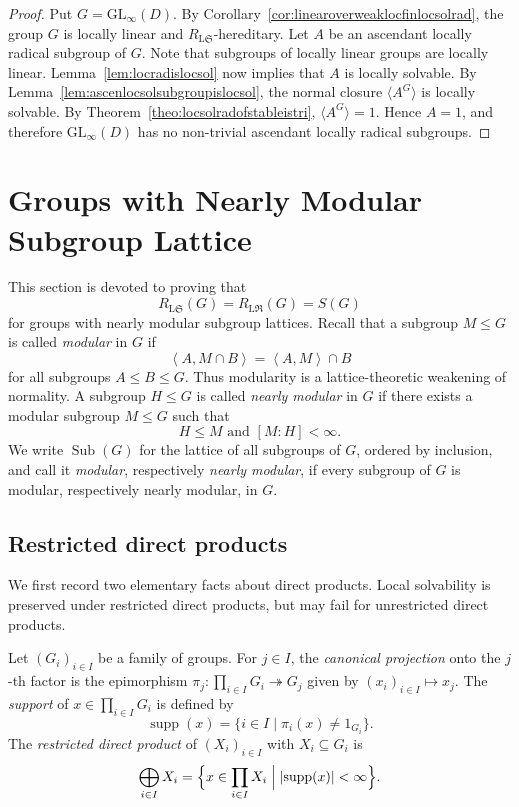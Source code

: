 \documentclass[11pt, reqno]{amsart}
\numberwithin{equation}{section}
\theoremstyle{definition}
\numberwithin{equation}{section}
\begin{document}
\begin{proof} Put $G=\mathrm{GL}_\infty(D). $ By Corollary~\ref{cor:linearoverweaklocfinlocsolrad}, the group $G$ is locally linear and $R_{\mathrm{L}\mathfrak S}$-hereditary. Let $A$ be an ascendant locally radical subgroup of $G$. Note that subgroups of locally linear groups are locally linear. Lemma~\ref{lem:locradislocsol} now implies that $A$ is locally solvable. By Lemma~\ref{lem:ascenlocsolsubgroupislocsol}, the normal closure $\langle A^G \rangle$ is locally solvable.  By Theorem~\ref{theo:locsolradofstableistri},
$\langle A^G\rangle=1.$
Hence $A=1$, and therefore $\mathrm{GL}_\infty(D)$ has no non-trivial ascendant locally radical subgroups. 
\end{proof}

\section{Groups with Nearly Modular Subgroup Lattice}
This section is devoted to proving that
  $$R_{\mathrm{L}\mathfrak S}(G)
  =
  R_{\mathrm{L}\mathfrak R}(G)
  =
  S(G)$$
for groups with nearly modular subgroup lattices.  Recall that a subgroup $M\leq G$ is called \emph{modular} in $G$ if $$ \left\langle A,M\cap B \right\rangle = \left\langle A,M \right\rangle \cap B $$ for all subgroups $A\leq B\leq G$. Thus modularity is a lattice-theoretic weakening of normality. A subgroup $H\leq G$ is called \emph{nearly modular} in $G$ if there exists a modular subgroup $M\leq G$ such that $$ H\leq M \text{ and } [M:H]<\infty. $$ 
We write $\operatorname{Sub}(G)$ for the lattice of all subgroups of $G$, ordered by inclusion, and call it \emph{modular}, respectively \emph{nearly modular}, if every subgroup of $G$ is modular, respectively nearly modular, in $G$.

\subsection{Restricted direct products} \hfill 

\medskip
We first record two elementary facts about direct products. Local solvability is preserved under restricted direct products, but may fail for unrestricted direct products.

 Let $(G_i)_{i \in I}$ be a family of groups. For $j \in I$, the \emph{canonical projection} onto the $j$-th factor is the epimorphism $\pi_j \colon \prod_{i \in I} G_i \twoheadrightarrow G_j$ given by $(x_i)_{i \in I} \mapsto x_j$. The \emph{support} of $x \in \prod_{i \in I} G_i$ is defined by 
$$ \operatorname{supp}(x) = \bigl\{ i \in I \mid \pi_i(x) \neq 1_{G_i} \bigr\}. $$ 
The \emph{restricted direct product} of $(X_i)_{i\in I}$ with $X_i\subseteq G_i$ is
$$ \bigoplus_{i \in I} X_i = \Bigl\{ x \in \prod_{i \in I} X_i \Bigm| \lvert\operatorname{supp}(x)\rvert < \infty \Bigr\}. $$
\end{document}
